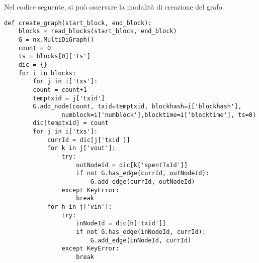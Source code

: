 Nel codice seguente, si può osservare la modalità di creazione del grafo.


\begin{lstlisting}[basicstyle=\tiny]
	def create_graph(start_block, end_block):
	blocks = read_blocks(start_block, end_block)	
	G = nx.MultiDiGraph()
	count = 0
	ts = blocks[0]['ts']
	dic = {} 	
	for i in blocks:
		for j in i['txs']:
		count = count+1
		temptxid = j['txid']
		G.add_node(count, txid=temptxid, blockhash=i['blockhash'], 
				numblock=i['numblock'],blocktime=i['blocktime'], ts=0)
		dic[temptxid] = count
		for j in i['txs']:
			currId = dic[j['txid']]
			for k in j['vout']:
				try:
					outNodeId = dic[k['spentTxId']]	
					if not G.has_edge(currId, outNodeId):
						G.add_edge(currId, outNodeId)
				except KeyError:
					break	
			for h in j['vin']:
				try:
					inNodeId = dic[h['txid']]
					if not G.has_edge(inNodeId, currId):
						G.add_edge(inNodeId, currId)
				except KeyError:
					break
	
\end{lstlisting}